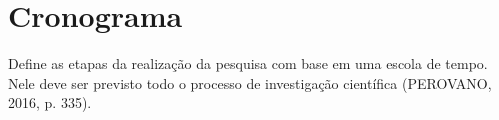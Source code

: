 \chapter{Cronograma}

Define as etapas da realização da pesquisa com base em uma escola
de tempo. Nele deve ser previsto todo o processo de investigação científica
(PEROVANO, 2016, p. 335).

